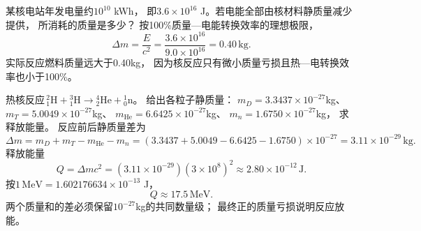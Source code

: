 \problemtext 某核电站年发电量约$10^{10}$ kWh，
即$3.6\times10^{16}$ J。若电能全部由核材料静质量减少提供，
所消耗的质量是多少？
\workings
按100\%质量—电能转换效率的理想极限，
\[
\boxed{\Delta m=\frac{E}{c^2}
=\frac{3.6\times10^{16}}{9.0\times10^{16}}
=0.40\,\mathrm{kg}}.
\]
\crosscheck 实际反应燃料质量远大于0.40kg，
因为核反应只有微小质量亏损且热—电转换效率也小于100\%。

\problemtext 热核反应$\,{}^{2}_{1}\mathrm H+{}^{3}_{1}\mathrm H
\to{}^{4}_{2}\mathrm{He}+{}^{1}_{0}\mathrm n$。
给出各粒子静质量：
$m_D=3.3437\times10^{-27}$kg、
$m_T=5.0049\times10^{-27}$kg、
$m_{\mathrm{He}}=6.6425\times10^{-27}$kg、
$m_n=1.6750\times10^{-27}$kg，
求释放能量。
\workings
反应前后静质量差为
\[
\Delta m=m_D+m_T-m_{\mathrm{He}}-m_n
=(3.3437+5.0049-6.6425-1.6750)\times10^{-27}
=3.11\times10^{-29}\,\mathrm{kg}.
\]
释放能量
\[
\boxed{Q=\Delta mc^2
=(3.11\times10^{-29})(3\times10^8)^2
\approx2.80\times10^{-12}\,\mathrm J}.
\]
按$1\,\mathrm{MeV}=1.602176634\times10^{-13}$ J，
\[
\boxed{Q\approx17.5\,\mathrm{MeV}}.
\]
\crosscheck 两个质量和的差必须保留$10^{-27}$kg的共同数量级；
最终正的质量亏损说明反应放能。
